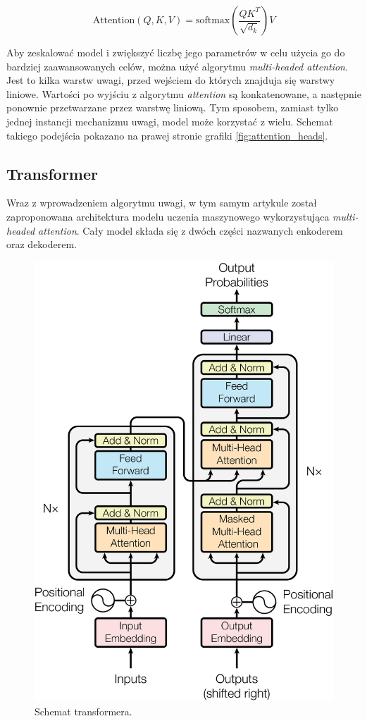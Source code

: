 \documentclass[data-science]{agh-wi} %
\begin{document}
\begin{equation}
    \text{Attention}(Q, K, V) = \text{softmax}\left(\dfrac{QK^T}{\sqrt{d_k}}\right)V
    \label{equ:attention}
\end{equation}

Aby zeskalować model i zwiększyć liczbę jego parametrów w celu użycia go do bardziej zaawansowanych celów, można użyć algorytmu \textit{multi-headed attention}. Jest to kilka warstw uwagi, przed wejściem do których znajduja się warstwy liniowe. Wartości po wyjściu z algorytmu \textit{attention} są konkatenowane, a następnie ponownie przetwarzane przez warstwę liniową. Tym sposobem, zamiast tylko jednej instancji mechanizmu uwagi, model może korzystać z wielu. Schemat takiego podejścia pokazano na prawej stronie grafiki \ref*{fig:attention_heads}.

\subsection{Transformer}
Wraz z wprowadzeniem algorytmu uwagi, w tym samym artykule został zaproponowana architektura modelu uczenia maszynowego wykorzystująca \textit{multi-headed attention}. Cały model składa się z dwóch części nazwanych enkoderem oraz dekoderem.

\begin{figure}[!ht]
    \begin{center}
        \includegraphics[width=0.7\linewidth]{img/transformer1}
    \end{center}
    \caption{Schemat transformera.}
    \label{fig:transformer1}
\end{figure}
\end{document}
